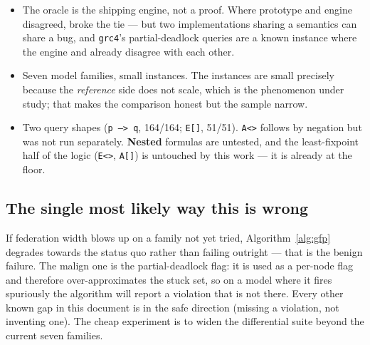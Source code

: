 \begin{itemize}
  \item The oracle is the shipping engine, not a proof. Where prototype and engine disagreed,
        \verifyta{} broke the tie --- but two implementations sharing a semantics can share a bug,
        and \texttt{grc4}'s partial-deadlock queries are a known instance where the engine and
        \verifyta{} already disagree with each other.
  \item Seven model families, small instances. The instances are small precisely because the
        \emph{reference} side does not scale, which is the phenomenon under study; that makes the
        comparison honest but the sample narrow.
  \item Two query shapes (\texttt{p --> q}, 164/164; \texttt{E[]}, 51/51). \texttt{A<>} follows by
        negation but was not run separately. \textbf{Nested} formulas are untested, and the
        least-fixpoint half of the logic (\texttt{E<>}, \texttt{A[]}) is untouched by this work ---
        it is already at the floor.
\end{itemize}

\subsection{The single most likely way this is wrong}

If federation width blows up on a family not yet tried, Algorithm~\ref{alg:gfp} degrades towards
the status quo rather than failing outright --- that is the benign failure. The malign one is the
partial-deadlock flag: it is used as a per-node flag and therefore over-approximates the stuck set,
so on a model where it fires spuriously the algorithm will report a violation that is not there.
Every other known gap in this document is in the safe direction (missing a violation, not inventing
one). The cheap experiment is to widen the differential suite beyond the current seven families.
